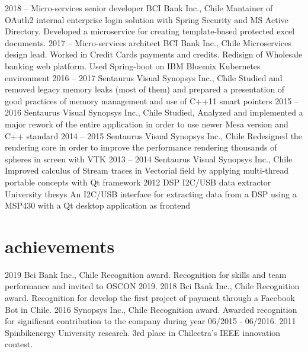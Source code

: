 \documentclass[]{friggeri-cv}
\begin{document}
\begin{entrylist}
  \entry
    {2018 – }
    {Micro-services senior developer}
    {BCI Bank Inc., Chile}
    {Mantainer of OAuth2 internal enterprise login solution with Spring Security and MS Active Directory. Developed a  microservice for creating template-based protected excel documents.}
    \entry
    {2017 – }
    {Micro-services architect}
    {BCI Bank Inc., Chile}
    {Microservices design lead. Worked in Credit Cards payments and credits. Redisign of Wholesale banking web platform. Used Spring-boot on IBM Bluemix Kubernetes environment}
  \entry
    {2016 – 2017}
    {Sentaurus Visual}
    {Synopsys Inc., Chile}
    {Studied and removed legacy memory leaks (most of them) and prepared a presentation of good practices of memory management and use of C++11 smart pointers}
  \entry
    {2015 – 2016}
    {Sentaurus Visual}
    {Synopsys Inc., Chile}
    {Studied, Analyzed and implemented a major rework of the entire application in order to use newer Mesa version and C++ standard}
  \entry
    {2014 – 2015}
    {Sentaurus Visual}
    {Synopsys Inc., Chile}
    {Redesigned the rendering core in order to improve the performance rendering thousands of spheres in screen with VTK}
  \entry
    {2013 – 2014}
    {Sentaurus Visual}
    {Synopsys Inc., Chile}
    {Improved calculus of Stream traces in Vectorial field by applying multi-thread portable concepts with Qt framework}
  \entry
    {2012}
    {DSP I2C/USB data extractor}
    {University thesys}
    {An I2C/USB interface for extracting data from a DSP using a MSP430 with a Qt desktop application as frontend}
\end{entrylist}

\section{achievements}

\begin{entrylist}
  \entry
    {2019}
    {Bci Bank Inc., Chile}
    {Recognition award.}
    {Recognition for skills and team performance and invited to OSCON 2019.}
    \entry
    {2018}
    {Bci Bank Inc., Chile}
    {Recognition award.}
    {Recognition for develop the first project of payment through a Facebook Bot in Chile.}
  \entry
    {2016}
    {Synopsys Inc., Chile}
    {Recognition award.}
    {Awarded recognition for significant contribution to the company during year 06/2015 - 06/2016.}
  \entry
    {2011}
    {Spinbikenergy}
    {University research.}
    {3rd place in Chilectra's IEEE innovation contest.}
\end{entrylist}
\end{document}
